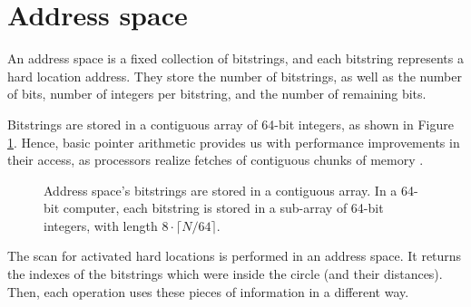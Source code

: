 \section{Address space}

An address space is a fixed collection of bitstrings, and each bitstring represents a hard location address. They store the number of bitstrings, as well as the number of bits, number of integers per bitstring, and the number of remaining bits.

Bitstrings are stored in a contiguous array of 64-bit integers, as shown in Figure \ref{tab:hl-addresses-detail}. Hence, basic pointer arithmetic provides us with performance improvements in their access, as processors realize fetches of contiguous chunks of memory  \citep{pai2004linux}.

\begin{figure}
\centering
{}

\caption{Address space's bitstrings are stored in a contiguous array. In a 64-bit computer, each bitstring is stored in a sub-array of 64-bit integers, with length $8 \cdot \lceil N/64 \rceil$.\label{tab:hl-addresses-detail}}
\end{figure}

The scan for activated hard locations is performed in an address space. It returns the indexes of the bitstrings which were inside the circle (and their distances). Then, each operation uses these pieces of information in a different way.

